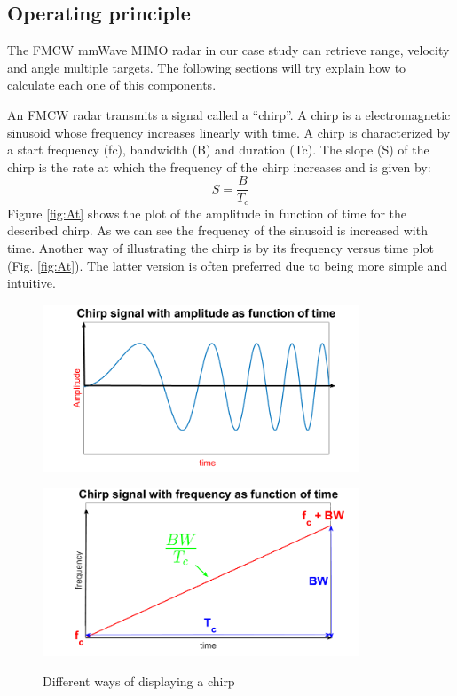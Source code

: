 \subsection{Operating principle}
The \ac{FMCW} \ac{mmWave} \ac{MIMO} radar in our case study can retrieve range, velocity and angle multiple targets. The following sections will try explain how to calculate each one of this components.


An \ac{FMCW} radar transmits a signal called a “chirp”. A chirp is a electromagnetic sinusoid whose frequency  increases linearly with time. A chirp is characterized by a start frequency (fc), bandwidth (B) and duration (Tc). The slope (S) of the chirp is the rate at which the frequency of the chirp increases and is given by:
\begin{equation}
    S=\frac{B}{T_c}
\end{equation}
Figure \ref{fig:At} shows the plot of the amplitude in function of time for the described chirp. As we can see the frequency of the sinusoid is increased with time. Another way of illustrating the chirp is by its frequency versus time plot (Fig. \ref{fig:At}). The latter version is often preferred due to being more simple and intuitive.

\begin{figure}[h] 
    \begin{minipage}[b]{.49\linewidth}
        \includegraphics[height=5cm,width=\linewidth]{imgs/chapter2/chirpAt.png}
        \label{fig:At}
    \end{minipage}
    \begin{minipage}[b]{.49\linewidth}
        \includegraphics[height=5cm,width=\linewidth]{imgs/chapter2/chirpFt.png}
        \label{fig:Ft}
    \end{minipage}
    \caption{Different ways of displaying a chirp}
    \label{fig:robotslidar}
\end{figure}

